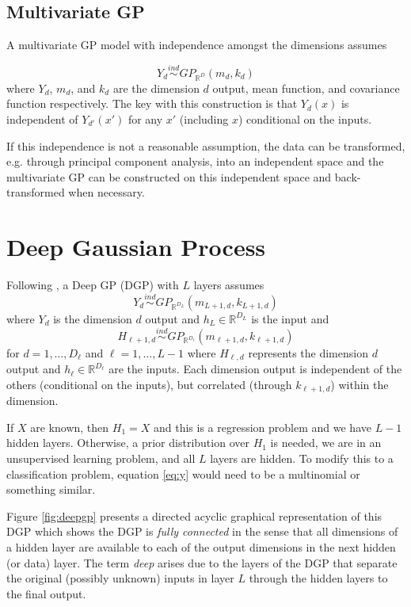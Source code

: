 \documentclass{article}
\newcommand{\ind}{\stackrel{ind}{\sim}}
\newcommand{\1}{\mathbbm{1}}
\begin{document}
\subsection{Multivariate GP}

A multivariate GP model with independence amongst the dimensions assumes 

\[
Y_d \ind GP_{\mathbb{R}^{D}}(m_{d},k_{d}) 
\]
where $Y_d$, $m_d$, and $k_d$ are the dimension $d$ output, mean function, 
and covariance function respectively.
The key with this construction is that $Y_d(x)$ is independent of 
$Y_{d'}(x')$ for any $x'$ (including $x$) conditional on the inputs. 

If this independence is not a reasonable assumption, 
the data can be transformed, 
e.g. through principal component analysis, into an independent space and
the multivariate GP can be constructed on this independent space and 
back-transformed when necessary.




\section{Deep Gaussian Process}
\label{sec:deepgp}

Following \cite{damianou2013deep}, 
a Deep GP (DGP) with $L$ layers assumes 
\begin{equation}
Y_d \ind GP_{\mathbb{R}^{D_L}}(m_{L+1,d},k_{L+1,d}) 
\label{eq:y}
\end{equation}
where $Y_d$ is the dimension $d$ output and $h_L \in \mathbb{R}^{D_L}$ is the
input
and
\[
H_{\ell+1,d} \ind GP_{\mathbb{R}^{D_\ell}}(m_{\ell+1,d},k_{\ell+1,d}) 
\]
for $d=1,\ldots,D_{\ell}$ and $\ell = 1,\ldots,L-1$
where $H_{\ell,d}$ represents the dimension $d$ output and 
$h_{\ell} \in \mathbb{R}^{D_{\ell}}$ are the inputs.
Each dimension output is independent of the others (conditional on the inputs), 
but correlated (through $k_{\ell+1,d}$) within the dimension.

If $X$ are known, then $H_1 = X$ and this is a regression problem and we have 
$L-1$ hidden layers.
Otherwise, a prior distribution over $H_1$ is needed, we are in an 
unsupervised learning problem, and all $L$ layers are hidden.
To modify this to a classification problem, equation \eqref{eq:y} would need to
be a multinomial or something similar.

Figure \ref{fig:deepgp} presents a directed acyclic graphical representation
of this DGP which shows the DGP is \emph{fully connected} in the sense that all 
dimensions of a hidden layer are available to each of the output dimensions 
in the next hidden (or data) layer. 
The term \emph{deep} arises due to the layers of the DGP that separate
the original (possibly unknown) inputs in layer $L$ through the hidden layers
to the final output.

\end{document}
